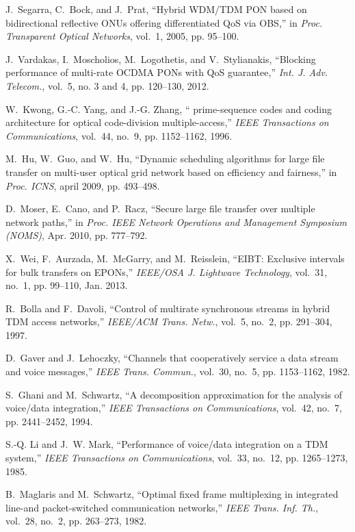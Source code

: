 \documentclass[article]{IEEEtran}
\begin{document}
\begin{thebibliography}{100}
J.~Segarra, C.~Bock, and J.~Prat, ``Hybrid {WDM/TDM PON} based on bidirectional
  reflective {ONUs} offering differentiated {QoS} via {OBS},'' in \emph{Proc.
  Transparent Optical Networks}, vol.~1, 2005, pp. 95--100.

J.~Vardakas, I.~Moscholios, M.~Logothetis, and V.~Stylianakis, ``Blocking
  performance of multi-rate {OCDMA PONs} with {QoS} guarantee,'' \emph{Int. J.
  Adv. Telecom.}, vol.~5, no. 3 and 4, pp. 120--130, 2012.

W.~Kwong, G.-C. Yang, and J.-G. Zhang, `` prime-sequence codes and coding
  architecture for optical code-division multiple-access,'' \emph{IEEE
  Transactions on Communications}, vol.~44, no.~9, pp. 1152--1162, 1996.

M.~Hu, W.~Guo, and W.~Hu, ``Dynamic scheduling algorithms for large file
  transfer on multi-user optical grid network based on efficiency and
  fairness,'' in \emph{Proc. ICNS}, april 2009, pp. 493--498.

D.~Moser, E.~Cano, and P.~Racz, ``Secure large file transfer over multiple
  network paths,'' in \emph{Proc. IEEE Network Operations and Management
  Symposium (NOMS)}, Apr. 2010, pp. 777--792.

X.~Wei, F.~Aurzada, M.~McGarry, and M.~Reisslein, ``{EIBT}: Exclusive intervals
  for bulk transfers on {EPONs},'' \emph{IEEE/OSA J. Lightwave Technology},
  vol.~31, no.~1, pp. 99--110, Jan. 2013.

R.~Bolla and F.~Davoli, ``Control of multirate synchronous streams in hybrid
  {TDM} access networks,'' \emph{IEEE/ACM Trans. Netw.}, vol.~5, no.~2, pp.
  291--304, 1997.

D.~Gaver and J.~Lehoczky, ``Channels that cooperatively service a data stream
  and voice messages,'' \emph{IEEE Trans. Commun.}, vol.~30, no.~5, pp.
  1153--1162, 1982.

S.~Ghani and M.~Schwartz, ``A decomposition approximation for the analysis of
  voice/data integration,'' \emph{IEEE Transactions on Communications},
  vol.~42, no.~7, pp. 2441--2452, 1994.

S.-Q. Li and J.~W. Mark, ``Performance of voice/data integration on a {TDM}
  system,'' \emph{IEEE Transactions on Communications}, vol.~33, no.~12, pp.
  1265--1273, 1985.

B.~Maglaris and M.~Schwartz, ``Optimal fixed frame multiplexing in integrated
  line-and packet-switched communication networks,'' \emph{IEEE Trans. Inf.
  Th.}, vol.~28, no.~2, pp. 263--273, 1982.


\end{thebibliography}
\end{document}
